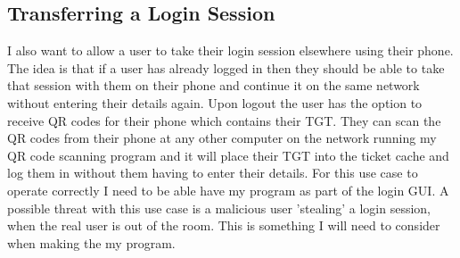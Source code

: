 \documentclass[]{report}   %
\begin{document}
\subsection{Transferring a Login Session}
I also want to allow a user to take their login session elsewhere using their phone. The idea is that if a user has already logged in then they should be able to take that session with them on their phone and continue it on the same network without entering their details again. Upon logout the user has the option to receive QR codes for their phone which contains their TGT. They can scan the QR codes from their phone at any other computer on the network running my QR code scanning program and it will place their TGT into the ticket cache and log them in without them having to enter their details. For this use case to operate correctly I need to be able have my program as part of the login GUI. A possible threat with this use case is a malicious user 'stealing' a login session, when the real user is out of the room. This is something I will need to consider when making the my program.



\end{document}
